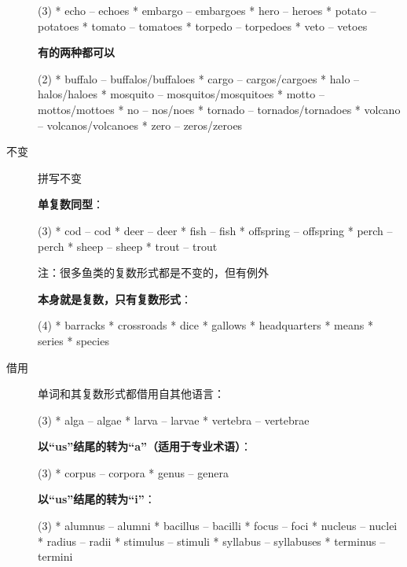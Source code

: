 \begin{description}
  \begin{taskitem}(3)
    *  echo -- echoes
    *  embargo -- embargoes
    *  hero -- heroes
    *  potato -- potatoes
    *  tomato -- tomatoes
    *  torpedo -- torpedoes
    *  veto -- vetoes
  \end{taskitem}

  \textbf{有的两种都可以}
  \begin{taskitem}(2)
    *  buffalo -- buffalos/buffaloes
    *  cargo -- cargos/cargoes
    *  halo -- halos/haloes
    *  mosquito -- mosquitos/mosquitoes
    *  motto -- mottos/mottoes
    *  no -- nos/noes
    *  tornado -- tornados/tornadoes
    *  volcano -- volcanos/volcanoes
    *  zero -- zeros/zeroes
  \end{taskitem}

\item [不变] 拼写不变

  \textbf{单复数同型}：
  \begin{taskitem}(3)
    *  cod -- cod
    *  deer -- deer
    *  fish -- fish
    *  offspring -- offspring
    *  perch -- perch
    *  sheep -- sheep
    *  trout -- trout
  \end{taskitem}

  注：很多鱼类的复数形式都是不变的，但有例外

  \textbf{本身就是复数，只有复数形式}：
  \begin{taskitem}(4)
    *  barracks
    *  crossroads
    *  dice
    *  gallows
    *  headquarters
    *  means
    *  series
    *  species
  \end{taskitem}

\item[借用] 单词和其复数形式都借用自其他语言：

  \begin{taskitem}(3)
    *  alga -- algae
    *  larva -- larvae
    *  vertebra -- vertebrae
  \end{taskitem}

  \textbf{以``us''结尾的转为``a''（适用于专业术语）}：
  \begin{taskitem}(3)
    *  corpus -- corpora
    *  genus -- genera
  \end{taskitem}

  \textbf{以``us''结尾的转为``i''}：
  \begin{taskitem}(3)
    *  alumnus -- alumni
    *  bacillus -- bacilli
    *  focus -- foci
    *  nucleus -- nuclei
    *  radius -- radii
    *  stimulus -- stimuli
    *  syllabus -- syllabuses
    *  terminus -- termini
  \end{taskitem}


\end{description}

